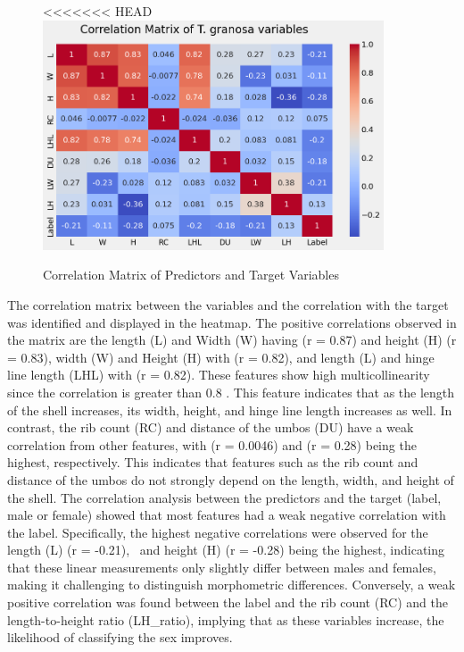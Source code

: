 \begin{figure}[!htbp]
	\centering
<<<<<<< HEAD
	\includegraphics[width=0.9\textwidth]{figures/corr_matrix.png}
	\caption{Correlation Matrix of Predictors and Target Variables}
\end{figure}

The correlation matrix between the variables and the correlation with the target was identified and displayed in the heatmap. The positive correlations observed in the matrix are the length (L) and Width (W) having (r = 0.87) and height (H) (r = 0.83), width (W) and Height (H) with (r = 0.82), and length (L) and hinge line length (LHL) with (r = 0.82). These features show high multicollinearity since the correlation is greater than 0.8 \cite{kim2019}. This feature indicates that as the length of the shell increases, its width, height, and hinge line length increases as well. In contrast, the rib count (RC) and distance of the umbos (DU) have a weak correlation from other features, with (r = 0.0046) and (r = 0.28) being the highest, respectively. This indicates that features such as the rib count and distance of the umbos do not strongly depend on the length, width, and height of the shell. 
The correlation analysis between the predictors and the target (label, male or female) showed that most features had a weak negative correlation with the label. Specifically, the highest negative correlations were observed for the length (L) (r = -0.21),  and height (H) (r = -0.28) being the highest, indicating that these linear measurements only slightly differ between males and females, making it challenging to distinguish morphometric differences. Conversely, a weak positive correlation was found between the label and the rib count (RC) and the length-to-height ratio (LH\_ratio), implying that as these variables increase, the likelihood of classifying the sex improves.

